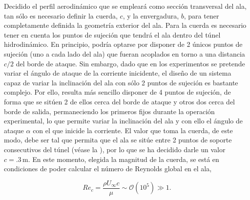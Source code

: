 Decidido el perfil aerodinámico que se empleará como sección transversal del ala, tan sólo es necesario definir la cuerda, $c$, y la envergadura, $b$, para tener completamente definida la geometría exterior del ala. Para la cuerda es necesario tener en cuenta los puntos de sujeción que tendrá el ala dentro del túnel hidrodinámico. En principio, podría optarse por disponer de 2 únicos puntos de sujeción (uno a cada lado del ala) que fueran acoplados en torno a una distancia $c/2$ del borde de ataque. Sin embargo, dado que en los experimentos se pretende variar el ángulo de ataque de la corriente inicidente, el diseño de un sistema capaz de variar la inclinación del ala con sólo 2 puntos de sujeción es bastante complejo. Por ello, resulta más sencillo disponer de 4 puntos de sujeción, de forma que se sitúen 2 de ellos cerca del borde de ataque y otros dos cerca del borde de salida, permaneciendo los primeros fijos durante la operación experimental, lo que permite variar la inclinación del ala y con ello el ángulo de ataque $\alpha$ con el que inicide la corriente. El valor que toma la cuerda, de este modo, debe ser tal que permita que el ala se sitúe entre 2 puntos de soporte consecutivos del túnel (véase la ), por lo que se ha decidido darle un valor $c = .3\,\mathrm{m}$. En este momento, elegida la magnitud de la cuerda,   se está en condiciones de poder calcular el número de Reynolds global en el ala, 

\begin{equation}
Re_{c}  = \dfrac{\rho U_{\infty} c}{\mu} \sim \mathcal{O}\left(10^{5}\right) \gg 1. 
\end{equation}

